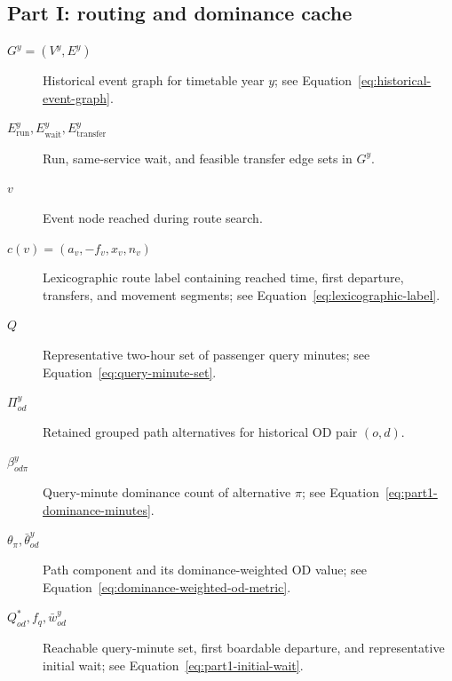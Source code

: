 \documentclass[preprint,12pt]{elsarticle}
\begin{document}
\subsection*{Part I: routing and dominance cache}
\begin{description}
    \item[$G^y=(V^y,E^y)$] Historical event graph for timetable year \(y\); see Equation~\eqref{eq:historical-event-graph}.
    \item[$E^y_{\mathrm{run}},E^y_{\mathrm{wait}},E^y_{\mathrm{transfer}}$] Run, same-service wait, and feasible transfer edge sets in \(G^y\).
    \item[$v$] Event node reached during route search.
    \item[$c(v)=(a_v,-f_v,x_v,n_v)$] Lexicographic route label containing reached time, first departure, transfers, and movement segments; see Equation~\eqref{eq:lexicographic-label}.
    \item[$Q$] Representative two-hour set of passenger query minutes; see Equation~\eqref{eq:query-minute-set}.
    \item[$\Pi^y_{od}$] Retained grouped path alternatives for historical OD pair \((o,d)\).
    \item[$\beta^y_{od\pi}$] Query-minute dominance count of alternative \(\pi\); see Equation~\eqref{eq:part1-dominance-minutes}.
    \item[$\theta_\pi,\bar\theta^y_{od}$] Path component and its dominance-weighted OD value; see Equation~\eqref{eq:dominance-weighted-od-metric}.
    \item[$Q^*_{od},f_q,\bar w^y_{od}$] Reachable query-minute set, first boardable departure, and representative initial wait; see Equation~\eqref{eq:part1-initial-wait}.
\end{description}
\end{document}
